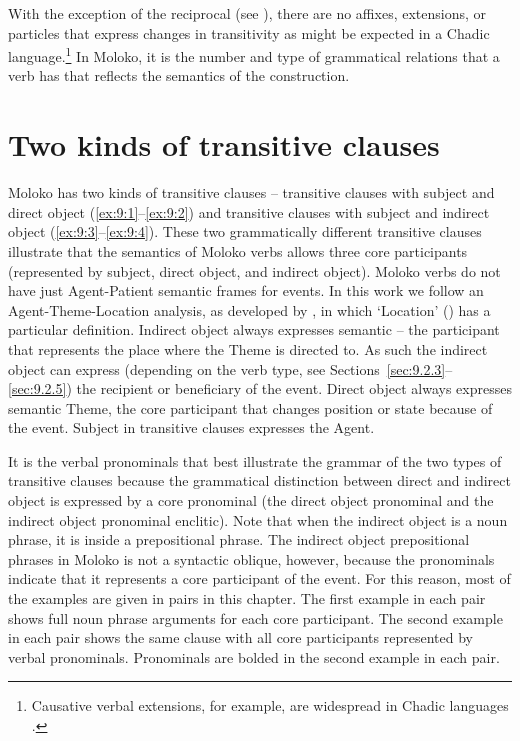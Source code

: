\largerpage With the exception of the reciprocal (see ), there are no affixes, extensions, or particles that express changes in transitivity as might be expected in a Chadic language.\footnote{Causative verbal extensions, for example, are widespread in Chadic languages \citep[276]{Newman1977}.} In Moloko, it is the number and type of grammatical relations that a verb has that reflects the semantics of the construction.

\section{Two kinds of transitive clauses}\label{sec:9.1}
\hypertarget{RefHeading1212641525720847}{}
Moloko has two kinds of transitive clauses -- transitive clauses with subject and direct object (\ref{ex:9:1}--\ref{ex:9:2}) and transitive clauses with subject and indirect object (\ref{ex:9:3}--\ref{ex:9:4}). These two grammatically different transitive clauses illustrate that the semantics of Moloko verbs allows three core participants (represented by subject, direct object, and indirect object). Moloko verbs do not have just Agent-Patient semantic frames for events. In this work we follow an Agent-Theme-Location analysis, as developed by \citet{DeLancey1991}, in which ‘Location’ (\LOC) has a particular definition. Indirect object always expresses semantic {\LOC} -- the participant that represents the place where the Theme is directed to. As such the indirect object can express (depending on the verb type, see Sections~\ref{sec:9.2.3}--\ref{sec:9.2.5}) the recipient or beneficiary of the event. Direct object always expresses semantic Theme, the core participant that changes position or state because of the event. Subject in transitive clauses expresses the Agent.

It is the verbal pronominals that best illustrate the grammar of the two types of transitive clauses because the grammatical distinction between direct and indirect object is expressed by a core pronominal (the direct object pronominal and the indirect object pronominal enclitic). Note that when the indirect object is a noun phrase, it is inside a prepositional phrase. The indirect object prepositional phrases in Moloko is not a syntactic oblique, however, because the pronominals indicate that it represents a core participant of the event. For this reason, most of the examples are given in pairs in this chapter. The first example in each pair shows full noun phrase arguments for each core participant. The second example in each pair shows the same clause with all core participants represented by verbal pronominals. Pronominals are bolded in the second example in each pair. 

